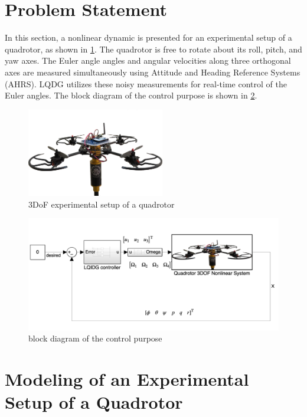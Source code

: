 \documentclass[conference]{IEEEtran}
\begin{document}
\section{Problem Statement}\label{sec:problem_statement}
In this section, a nonlinear dynamic is presented for an experimental setup of a quadrotor, as shown in \figurename{\ref{quadlab}}.
The quadrotor is free to rotate about its roll, pitch, and yaw axes. The Euler angle angles and angular velocities along three orthogonal axes are measured simultaneously using Attitude and Heading Reference Systems (AHRS). LQDG utilizes these noisy measurements for real-time control of the Euler angles. The block diagram of the control purpose is shown in \figurename{\ref{block_diagram}}.
\begin{figure}[!h]
	\includegraphics[width=6cm]{../Figures/introduction/3DOFQuad.png}
	\centering
	\caption{3DoF experimental setup of a quadrotor}
	\label{quadlab}
\end{figure}
\begin{figure}[!h]
	\includegraphics[width=.9\linewidth]{../Figures/introduction/block_diagram.png}
	\centering
	\caption{block diagram of the control purpose}
	\label{block_diagram}
\end{figure}


\section{Modeling of an Experimental Setup of a Quadrotor}\label{sec:modeling}
\end{document}
